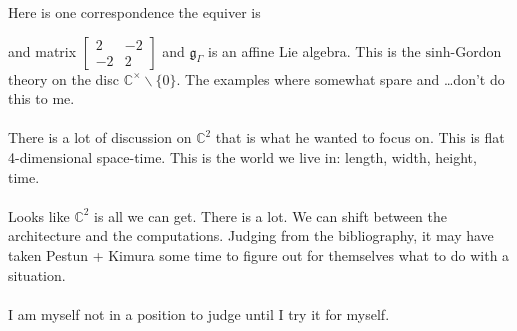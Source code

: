\documentclass[12pt]{article}
\begin{document}
Here is one correspondence the equiver is 
 and matrix $\left[\begin{array}{rr} 2 & -2 \\ -2 & 2 \end{array}\right]$ and $\mathfrak{g}_\Gamma$ is an affine Lie algebra.  This is the $\mathrm{sinh}$-Gordon theory on the disc $\mathbb{C}^\times \backslash \{ 0\}$. The examples where somewhat spare and \dots don't do this to me. \\ \\
There is a lot of discussion on $\mathbb{C}^2$ that is what he wanted to focus on.  This is flat 4-dimensional space-time.  This is the world we live in: length, width, height, time.  \\ \\
Looks like $\mathbb{C}^2$ is all we can get. There is a lot. We can shift between the architecture and the computations.  Judging from the bibliography, it may have taken Pestun + Kimura some time to figure out for themselves what to do with a situation. \\\\
I am myself not in a position to judge until I try it for myself.

\newpage
\end{document}
